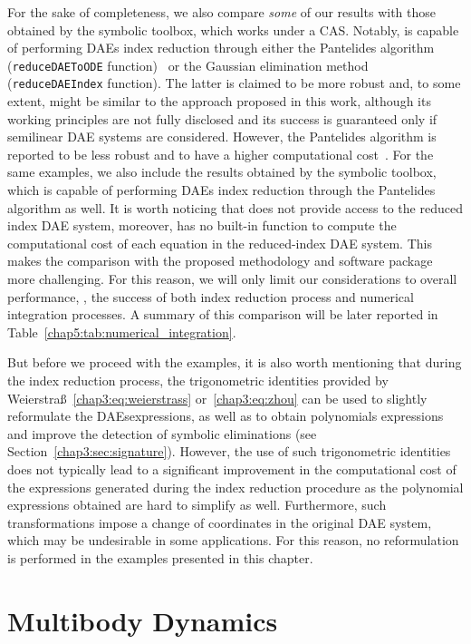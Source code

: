 For the sake of completeness, we also compare \emph{some} of our results with those obtained by the \Matlab{} symbolic toolbox, which works under a \MuPAD{} \ac{CAS}. Notably, \Matlab{} is capable of performing \acp{DAE} index reduction through either the Pantelides algorithm (\texttt{reduceDAEToODE} function)~\cite{pantelides1988consistent} or the Gaussian elimination method (\texttt{reduceDAEIndex} function). The latter is claimed to be more robust and, to some extent, might be similar to the approach proposed in this work, although its working principles are not fully disclosed and its success is guaranteed only if semilinear \ac{DAE} systems are considered. However, the Pantelides algorithm is reported to be less robust and to have a higher computational cost~\cite{matlabdaes}. For the same examples, we also include the results obtained by the \Mathematica{} symbolic toolbox, which is capable of performing \acp{DAE} index reduction through the Pantelides algorithm as well. It is worth noticing that \Mathematica{} does not provide access to the reduced index \ac{DAE} system, moreover, \Matlab{} has no built-in function to compute the computational cost of each equation in the reduced-index \ac{DAE} system. This makes the comparison with the proposed methodology and software package more challenging. For this reason, we will only limit our considerations to overall performance, \ie{}, the success of both index reduction process and numerical integration processes. A summary of this comparison will be later reported in Table~\eqref{chap5:tab:numerical_integration}.

But before we proceed with the examples, it is also worth mentioning that during the index reduction process, the trigonometric identities provided by Weierstra{\ss}~\eqref{chap3:eq:weierstrass} or~\eqref{chap3:eq:zhou} can be used to slightly reformulate the \acp{DAE}expressions, as well as to obtain polynomials expressions and improve the detection of symbolic eliminations (see Section~\ref{chap3:sec:signature}). However, the use of such trigonometric identities does not typically lead to a significant improvement in the computational cost of the expressions generated during the index reduction procedure as the polynomial expressions obtained are hard to simplify as well. Furthermore, such transformations impose a change of coordinates in the original \ac{DAE} system, which may be undesirable in some applications. For this reason, no reformulation is performed in the examples presented in this chapter.

\section{Multibody Dynamics}
\label{chap5:sec:mbd}

